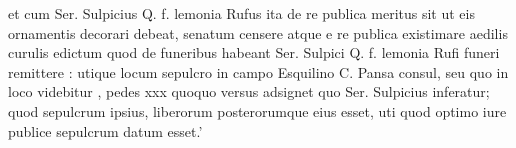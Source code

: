  et cum Ser. Sulpicius Q. f. lemonia Rufus ita de re publica meritus sit ut eis ornamentis decorari debeat, senatum censere atque e re publica existimare aedilis curulis edictum quod de funeribus habeant Ser. Sulpici Q. f. lemonia Rufi funeri remittere : utique locum sepulcro in campo Esquilino C. Pansa consul, seu quo in loco videbitur , pedes xxx quoquo versus adsignet quo Ser. Sulpicius inferatur; quod sepulcrum ipsius, liberorum posterorumque eius esset, uti quod optimo iure publice sepulcrum datum esset.'
